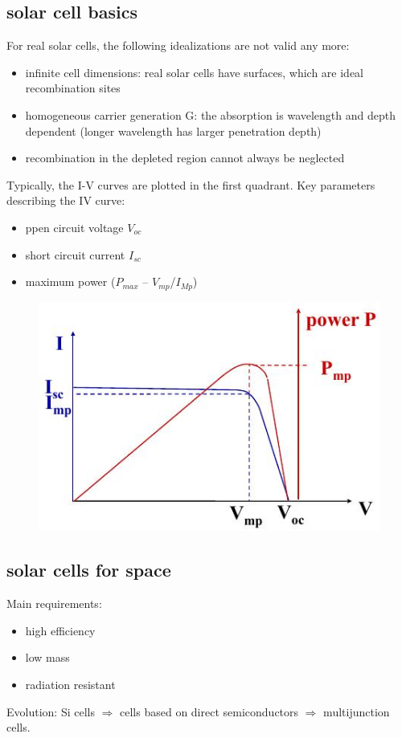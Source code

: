 \subsection{solar cell basics}
For real solar cells, the following idealizations are not valid any more:
\begin{itemize}
 \item infinite cell dimensions: real solar cells have surfaces, which are ideal recombination sites
 \item homogeneous carrier generation G: the absorption is wavelength and depth dependent (longer wavelength has larger penetration depth)
 \item recombination in the depleted region cannot always be neglected
\end{itemize}
Typically, the I-V curves are plotted in the first quadrant. Key parameters describing the IV curve:
\begin{itemize}
 \item ppen circuit voltage $V_{oc}$
 \item short circuit current $I_{sc}$
 \item maximum power ($P_{max}$ – $V_{mp}$/$I_{Mp}$)
\end{itemize} 
\begin{figure}[!ht]
 \centering
 \includegraphics[scale=0.5]{solarcell}
\end{figure}

\subsection{solar cells for space}
Main requirements:
\begin{itemize}
 \item high efficiency
 \item low mass
 \item radiation resistant
\end{itemize}
Evolution: Si cells $\Rightarrow$ cells based on direct semiconductors $\Rightarrow$ multijunction cells.\\
\vspace*{3pt}

